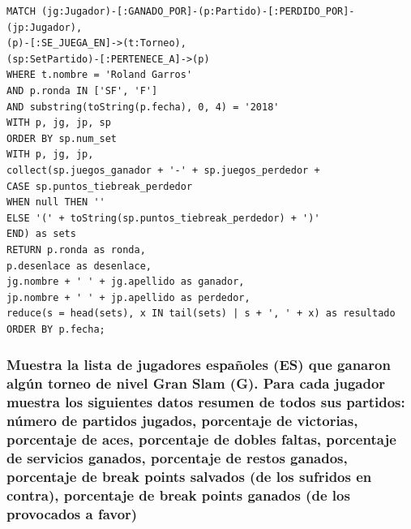 \documentclass[11pt]{opticajnl}
\begin{document}
\begin{lstlisting}[language=Cypher]
MATCH (jg:Jugador)-[:GANADO_POR]-(p:Partido)-[:PERDIDO_POR]-(jp:Jugador),
(p)-[:SE_JUEGA_EN]->(t:Torneo),
(sp:SetPartido)-[:PERTENECE_A]->(p)
WHERE t.nombre = 'Roland Garros'
AND p.ronda IN ['SF', 'F']
AND substring(toString(p.fecha), 0, 4) = '2018'
WITH p, jg, jp, sp
ORDER BY sp.num_set
WITH p, jg, jp,
collect(sp.juegos_ganador + '-' + sp.juegos_perdedor +
CASE sp.puntos_tiebreak_perdedor
WHEN null THEN ''
ELSE '(' + toString(sp.puntos_tiebreak_perdedor) + ')'
END) as sets
RETURN p.ronda as ronda,
p.desenlace as desenlace,
jg.nombre + ' ' + jg.apellido as ganador,
jp.nombre + ' ' + jp.apellido as perdedor,
reduce(s = head(sets), x IN tail(sets) | s + ', ' + x) as resultado
ORDER BY p.fecha;
\end{lstlisting}





\subsubsection{Muestra la lista de jugadores españoles (ES) que ganaron algún torneo de nivel Gran Slam (G). Para cada jugador muestra los siguientes datos resumen de todos sus partidos: número de partidos jugados, porcentaje de victorias, porcentaje de aces, porcentaje de dobles faltas, porcentaje de servicios ganados, porcentaje de restos ganados, porcentaje de break points salvados (de los sufridos en contra), porcentaje de break points ganados (de los provocados a favor)}
\end{document}
